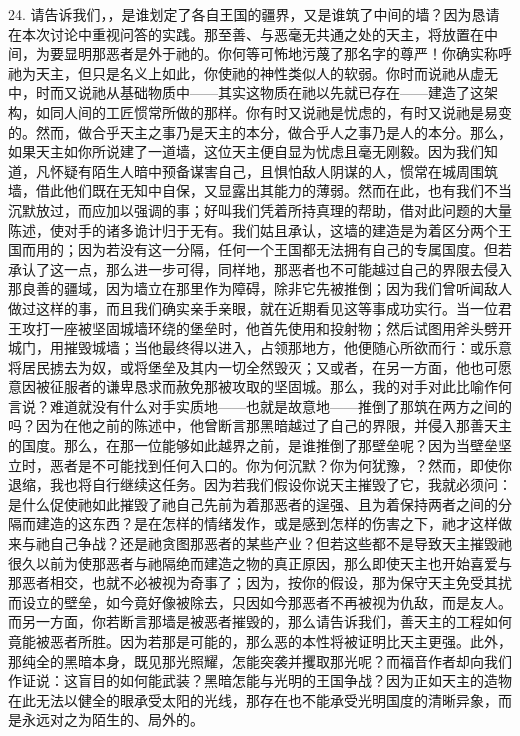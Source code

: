 24. 请告诉我们，，是谁划定了各自王国的疆界，又是谁筑了中间的墙？因为恳请在本次讨论中重视问答的实践。那至善、与恶毫无共通之处的天主，将放置在中间，为要显明那恶者是外于祂的。你何等可怖地污蔑了那名字的尊严！你确实称呼祂为天主，但只是名义上如此，你使祂的神性类似人的软弱。你时而说祂从虚无中，时而又说祂从基础物质中——其实这物质在祂以先就已存在——建造了这架构，如同人间的工匠惯常所做的那样。你有时又说祂是忧虑的，有时又说祂是易变的。然而，做合乎天主之事乃是天主的本分，做合乎人之事乃是人的本分。那么，如果天主如你所说建了一道墙，这位天主便自显为忧虑且毫无刚毅。因为我们知道，凡怀疑有陌生人暗中预备谋害自己，且惧怕敌人阴谋的人，惯常在城周围筑墙，借此他们既在无知中自保，又显露出其能力的薄弱。然而在此，也有我们不当沉默放过，而应加以强调的事；好叫我们凭着所持真理的帮助，借对此问题的大量陈述，使对手的诸多诡计归于无有。我们姑且承认，这墙的建造是为着区分两个王国而用的；因为若没有这一分隔，任何一个王国都无法拥有自己的专属国度。但若承认了这一点，那么进一步可得，同样地，那恶者也不可能越过自己的界限去侵入那良善的疆域，因为墙立在那里作为障碍，除非它先被推倒；因为我们曾听闻敌人做过这样的事，而且我们确实亲手亲眼，就在近期看见这等事成功实行。当一位君王攻打一座被坚固城墙环绕的堡垒时，他首先使用和投射物；然后试图用斧头劈开城门，用摧毁城墙；当他最终得以进入，占领那地方，他便随心所欲而行：或乐意将居民掳去为奴，或将堡垒及其内一切全然毁灭；又或者，在另一方面，他也可愿意因被征服者的谦卑恳求而赦免那被攻取的坚固城。那么，我的对手对此比喻作何言说？难道就没有什么对手实质地——也就是故意地——推倒了那筑在两方之间的吗？因为在他之前的陈述中，他曾断言那黑暗越过了自己的界限，并侵入那善天主的国度。那么，在那一位能够如此越界之前，是谁推倒了那壁垒呢？因为当壁垒坚立时，恶者是不可能找到任何入口的。你为何沉默？你为何犹豫，？然而，即使你退缩，我也将自行继续这任务。因为若我们假设你说天主摧毁了它，我就必须问：是什么促使祂如此摧毁了祂自己先前为着那恶者的逞强、且为着保持两者之间的分隔而建造的这东西？是在怎样的情绪发作，或是感到怎样的伤害之下，祂才这样做来与祂自己争战？还是祂贪图那恶者的某些产业？但若这些都不是导致天主摧毁祂很久以前为使那恶者与祂隔绝而建造之物的真正原因，那么即使天主也开始喜爱与那恶者相交，也就不必被视为奇事了；因为，按你的假设，那为保守天主免受其扰而设立的壁垒，如今竟好像被除去，只因如今那恶者不再被视为仇敌，而是友人。而另一方面，你若断言那墙是被恶者摧毁的，那么请告诉我们，善天主的工程如何竟能被恶者所胜。因为若那是可能的，那么恶的本性将被证明比天主更强。此外，那纯全的黑暗本身，既见那光照耀，怎能突袭并攫取那光呢？而福音作者却向我们作证说：这盲目的如何能武装？黑暗怎能与光明的王国争战？因为正如天主的造物在此无法以健全的眼承受太阳的光线，那存在也不能承受光明国度的清晰异象，而是永远对之为陌生的、局外的。\par

